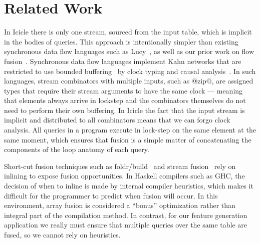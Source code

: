 \eject
\section{Related Work}
\label{s:Conclusion}


In Icicle there is only one stream, sourced from the input table, which is implicit in the bodies of queries. This approach is intentionally simpler than existing synchronous data flow languages such as Lucy~\cite{mandel2010lucy}, as well as our prior work on flow fusion~\cite{lippmeier2013data}. Synchronous data flow languages implement Kahn networks that are restricted to use bounded buffering~\cite{johnston2004advances} by clock typing and causal analysis~\cite{stephens1997survey}. In such languages, stream combinators with multiple inputs, such as @zip@, are assigned types that require their stream arguments to have the same clock --- meaning that elements always arrive in lockstep and the combinators themselves do not need to perform their own buffering. In Icicle the fact that the input stream is implicit and distributed to all combinators means that we can forgo clock analysis. All queries in a program execute in lock-step on the same element at the same moment, which ensures that fusion is a simple matter of concatenating the components of the loop anatomy of each query.

Short-cut fusion techniques such as foldr/build~\cite{gill1993short} and stream fusion~\cite{coutts2007stream} rely on inlining to expose fusion opportunities. In Haskell compilers such as GHC, the decision of when to inline is made by internal compiler heuristics, which makes it difficult for the programmer to predict when fusion will occur. In this environment, array fusion is considered a ``bonus'' optimization rather than integral part of the compilation method. In contrast, for our feature generation application we really must ensure that multiple queries over the same table are fused, so we cannot rely on heuristics.

